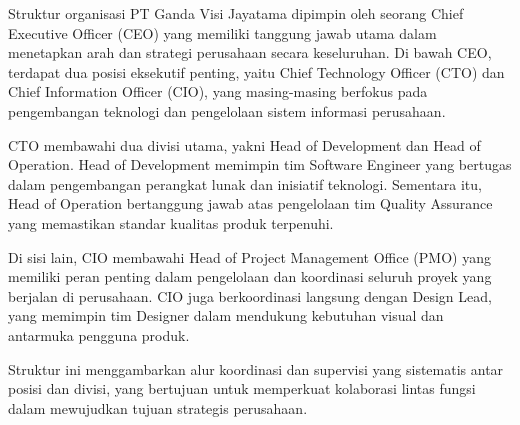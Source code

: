 Struktur organisasi PT Ganda Visi Jayatama dipimpin oleh seorang Chief Executive Officer (CEO) yang memiliki tanggung jawab utama dalam menetapkan arah dan strategi perusahaan secara keseluruhan. Di bawah CEO, terdapat dua posisi eksekutif penting, yaitu Chief Technology Officer (CTO) dan Chief Information Officer (CIO), yang masing-masing berfokus pada pengembangan teknologi dan pengelolaan sistem informasi perusahaan.

CTO membawahi dua divisi utama, yakni Head of Development dan Head of Operation. Head of Development memimpin tim Software Engineer yang bertugas dalam pengembangan perangkat lunak dan inisiatif teknologi. Sementara itu, Head of Operation bertanggung jawab atas pengelolaan tim Quality Assurance yang memastikan standar kualitas produk terpenuhi.

Di sisi lain, CIO membawahi Head of Project Management Office (PMO) yang memiliki peran penting dalam pengelolaan dan koordinasi seluruh proyek yang berjalan di perusahaan. CIO juga berkoordinasi langsung dengan Design Lead, yang memimpin tim Designer dalam mendukung kebutuhan visual dan antarmuka pengguna produk.

Struktur ini menggambarkan alur koordinasi dan supervisi yang sistematis antar posisi dan divisi, yang bertujuan untuk memperkuat kolaborasi lintas fungsi dalam mewujudkan tujuan strategis perusahaan.


